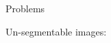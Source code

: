 \documentclass[10pt]{beamer}
\begin{document}
\begin{frame}{Problems}{}
  
	\small{Un-segmentable images: }
  \begin{figure}[htbp]
        \centering
\end{figure}
\end{frame}
\end{document}

